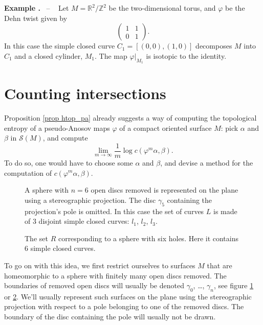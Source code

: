 \documentclass[a4paper, 11pt, leqno]{article}
\newcommand{\real}{\mathbb{R}}
\newcommand{\integer}{\mathbb{Z}}
\newcommand{\restr}[1]{|_{#1}}
\newcommand{\s}{\mathscr S}
\newcounter{prop}[section]
\newcounter{ex}[section]
\renewcommand{\theex}{\arabic{section}.\arabic{ex}}
\newenvironment{ex}[0]%
{\refstepcounter{ex}\vspace{10pt}\par\noindent 
{\bf Example \theex} \ -- \ }%
{\par\vspace{0.2cm}}
\begin{document}
\begin{ex}
  Let $M=\real^2 / \integer^2$ be the two-dimensional torus, and
  $\varphi$ be the Dehn twist given by
  $$
  \begin{pmatrix}
    1 & 1 \\
    0 & 1
  \end{pmatrix}.
  $$
  In this case the simple closed curve $C_1 = [(0,0), (1,0)]$
  decomposes $M$ into $C_1$ and a closed cylinder, $M_1$.
  The map $\varphi\restr{M_1}$ is isotopic to the identity.
\end{ex}

\section{Counting intersections}
Proposition \ref{prop htop_pa} already suggests a way of computing the
topological entropy of a pseudo-Anosov maps $\varphi$ of a compact
oriented surface $M$: pick $\alpha$ and $\beta$ in $\s (M)$, and
compute 
$$
\lim_{m\rightarrow \infty} \frac{1}{m} \log c(\varphi^m \alpha,
\beta).$$
To do so, one would have to choose some $\alpha$ and $\beta$, and
devise a method for the computation of $c(\varphi^m \alpha, \beta)$.

\begin{figure}[hbt!]
  \begin{center}
    
    \caption{\label{fig L} A sphere with $n=6$ open discs removed 
      is represented on the plane using a stereographic projection.
      The disc $\gamma_5$ containing the projection's pole is omitted.
      In this case the set of curves $L$ is made of $3$ 
      disjoint simple closed curves: $l_1$, $l_2$, $l_3$.}
  \end{center}
\end{figure}

\begin{figure}[hbt!]
  \begin{center}
    
    \caption{\label{fig R} The set $R$ corresponding to a sphere with six
      holes. Here it contains 6 simple closed curves.}
  \end{center}
\end{figure}

To go on with this idea, we first restrict ourselves to surfaces $M$
that are homeomorphic to a sphere with finitely many open discs removed.
The boundaries of removed open discs will usually be denoted 
$\gamma_0$, \ldots, $\gamma_n$, see figure 
\ref{fig L} or \ref{fig R}.
We'll usually represent such surfaces on the plane using the
stereographic projection with respect to a pole belonging to one of
the removed discs. The boundary of the disc containing the pole 
will usually not be drawn.
\end{document}
